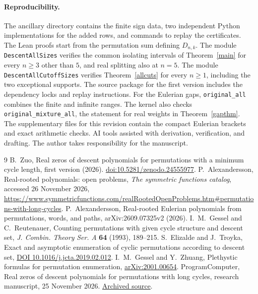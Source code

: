 \documentclass[11pt]{article}
\begin{document}



\paragraph{Reproducibility.}
The ancillary directory contains the finite sign data, two independent Python implementations for the added rows, and commands to replay the certificates.
The Lean proofs start from the permutation sum defining $D_{n,k}$. The module \texttt{DescentAllSizes} verifies the common isolating intervals of Theorem~\ref{main} for every $n\ge3$ other than $5$, and real splitting also at $n=5$. The module \texttt{DescentAllCutoffSizes} verifies Theorem~\ref{allcuts} for every $n\ge1$, including the two exceptional supports. The source package for the first version includes the dependency locks and replay instructions. For the Eulerian gaps, \texttt{original\_all} combines the finite and infinite ranges. The kernel also checks \texttt{original\_mixture\_all}, the statement for real weights in Theorem~\ref{gapthm}. The supplementary files for this revision contain the compact Eulerian brackets and exact arithmetic checks. AI tools assisted with derivation, verification, and drafting. The author takes responsibility for the manuscript.

\begin{thebibliography}{9}
 B.~Zuo, Real zeros of descent polynomials for permutations with a minimum cycle length, first version (2026). \href{https://doi.org/10.5281/zenodo.24555977}{doi:10.5281/zenodo.24555977}.
 P.~Alexandersson, Real-rooted polynomials: open problems,
\emph{The symmetric functions catalog}, accessed 26 November 2026,
\url{https://www.symmetricfunctions.com/realRootedOpenProblems.htm#permutations-with-long-cycles}.
 P.~Alexandersson, Real-rooted Eulerian polynomials from permutations, words, and paths,
arXiv:2609.07325v2 (2026).
 I.~M.~Gessel and C.~Reutenauer, Counting permutations with given cycle structure and descent set, \emph{J. Combin. Theory Ser. A} \textbf{64} (1993), 189--215.
 S.~Elizalde and J.~Troyka, Exact and asymptotic enumeration of cyclic permutations according to descent set, \href{https://doi.org/10.1016/j.jcta.2019.02.012}{DOI 10.1016/j.jcta.2019.02.012}.
 I.~M.~Gessel and Y.~Zhuang, Plethystic formulas for permutation enumeration, \href{https://arxiv.org/abs/2001.00654}{arXiv:2001.00654}.
 ProgramComputer, Real zeros of descent polynomials for permutations with long cycles, research manuscript, 25 November 2026. \href{https://github.com/ProgramComputer/open-math-research/blob/4da48b72ed8f92f96c2faf60e2d63d253b3b507a/topics/long-cycle-descents/paper.tex}{Archived source}.
\end{thebibliography}
\end{document}
